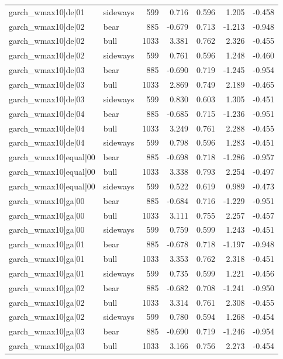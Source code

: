 \begin{table}
\begin{tabular}{llrrrrr}
garch\_wmax10|de|01 & sideways & 599 & 0.716 & 0.596 & 1.205 & -0.458 \\
garch\_wmax10|de|02 & bear & 885 & -0.679 & 0.713 & -1.213 & -0.948 \\
garch\_wmax10|de|02 & bull & 1033 & 3.381 & 0.762 & 2.326 & -0.455 \\
garch\_wmax10|de|02 & sideways & 599 & 0.761 & 0.596 & 1.248 & -0.460 \\
garch\_wmax10|de|03 & bear & 885 & -0.690 & 0.719 & -1.245 & -0.954 \\
garch\_wmax10|de|03 & bull & 1033 & 2.869 & 0.749 & 2.189 & -0.465 \\
garch\_wmax10|de|03 & sideways & 599 & 0.830 & 0.603 & 1.305 & -0.451 \\
garch\_wmax10|de|04 & bear & 885 & -0.685 & 0.715 & -1.236 & -0.951 \\
garch\_wmax10|de|04 & bull & 1033 & 3.249 & 0.761 & 2.288 & -0.455 \\
garch\_wmax10|de|04 & sideways & 599 & 0.798 & 0.596 & 1.283 & -0.451 \\
garch\_wmax10|equal|00 & bear & 885 & -0.698 & 0.718 & -1.286 & -0.957 \\
garch\_wmax10|equal|00 & bull & 1033 & 3.338 & 0.793 & 2.254 & -0.497 \\
garch\_wmax10|equal|00 & sideways & 599 & 0.522 & 0.619 & 0.989 & -0.473 \\
garch\_wmax10|ga|00 & bear & 885 & -0.684 & 0.716 & -1.229 & -0.951 \\
garch\_wmax10|ga|00 & bull & 1033 & 3.111 & 0.755 & 2.257 & -0.457 \\
garch\_wmax10|ga|00 & sideways & 599 & 0.759 & 0.599 & 1.243 & -0.451 \\
garch\_wmax10|ga|01 & bear & 885 & -0.678 & 0.718 & -1.197 & -0.948 \\
garch\_wmax10|ga|01 & bull & 1033 & 3.353 & 0.762 & 2.318 & -0.451 \\
garch\_wmax10|ga|01 & sideways & 599 & 0.735 & 0.599 & 1.221 & -0.456 \\
garch\_wmax10|ga|02 & bear & 885 & -0.682 & 0.708 & -1.241 & -0.950 \\
garch\_wmax10|ga|02 & bull & 1033 & 3.314 & 0.761 & 2.308 & -0.455 \\
garch\_wmax10|ga|02 & sideways & 599 & 0.780 & 0.594 & 1.268 & -0.454 \\
garch\_wmax10|ga|03 & bear & 885 & -0.690 & 0.719 & -1.246 & -0.954 \\
garch\_wmax10|ga|03 & bull & 1033 & 3.166 & 0.756 & 2.273 & -0.454 \\

\end{tabular}
\end{table}
